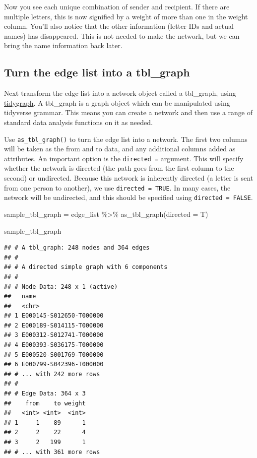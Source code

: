 \documentclass[
]{book}
\newenvironment{Shaded}{\begin{snugshade}}{\end{snugshade}}
\newcommand{\AttributeTok}[1]{\textcolor[rgb]{0.77,0.63,0.00}{#1}}
\newcommand{\FunctionTok}[1]{\textcolor[rgb]{0.00,0.00,0.00}{#1}}
\newcommand{\NormalTok}[1]{#1}
\newcommand{\OtherTok}[1]{\textcolor[rgb]{0.56,0.35,0.01}{#1}}
\newcommand{\SpecialCharTok}[1]{\textcolor[rgb]{0.00,0.00,0.00}{#1}}
\begin{document}
Now you see each unique combination of sender and recipient. If there are multiple letters, this is now signified by a weight of more than one in the weight column. You'll also notice that the other information (letter IDs and actual names) has disappeared. This is not needed to make the network, but we can bring the name information back later.

\hypertarget{turn-the-edge-list-into-a-tbl_graph}{%
\subsection{Turn the edge list into a tbl\_graph}\label{turn-the-edge-list-into-a-tbl_graph}}

Next transform the edge list into a network object called a tbl\_graph, using \href{https://www.data-imaginist.com/2017/introducing-tidygraph/}{tidygraph}. A tbl\_graph is a graph object which can be manipulated using tidyverse grammar. This means you can create a network and then use a range of standard data analysis functions on it as needed.

Use \texttt{as\_tbl\_graph()} to turn the edge list into a network. The first two columns will be taken as the from and to data, and any additional columns added as attributes. An important option is the \texttt{directed\ =} argument. This will specify whether the network is directed (the path goes from the first column to the second) or undirected. Because this network is inherently directed (a letter is sent from one person to another), we use \texttt{directed\ =\ TRUE}. In many cases, the network will be undirected, and this should be specified using \texttt{directed\ =\ FALSE}.

\begin{Shaded}
\begin{Highlighting}[]
\NormalTok{sample\_tbl\_graph }\OtherTok{=}\NormalTok{ edge\_list }\SpecialCharTok{\%\textgreater{}\%} 
  \FunctionTok{as\_tbl\_graph}\NormalTok{(}\AttributeTok{directed =}\NormalTok{ T)}

\NormalTok{sample\_tbl\_graph}
\end{Highlighting}
\end{Shaded}

\begin{verbatim}
## # A tbl_graph: 248 nodes and 364 edges
## #
## # A directed simple graph with 6 components
## #
## # Node Data: 248 x 1 (active)
##   name                   
##   <chr>                  
## 1 E000145-S012650-T000000
## 2 E000189-S014115-T000000
## 3 E000312-S012741-T000000
## 4 E000393-S036175-T000000
## 5 E000520-S001769-T000000
## 6 E000799-S042396-T000000
## # ... with 242 more rows
## #
## # Edge Data: 364 x 3
##    from    to weight
##   <int> <int>  <int>
## 1     1    89      1
## 2     2    22      4
## 3     2   199      1
## # ... with 361 more rows
\end{verbatim}
\end{document}
